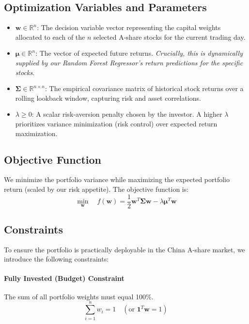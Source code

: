 \documentclass[conference]{IEEEtran}
\begin{document}
\subsection{Optimization Variables and Parameters}
\begin{itemize}
    \item $\mathbf{w} \in \mathbb{R}^n$: The decision variable vector representing the capital weights allocated to each of the $n$ selected A-share stocks for the current trading day.
    \item $\boldsymbol{\mu} \in \mathbb{R}^n$: The vector of expected future returns. \textit{Crucially, this is dynamically supplied by our Random Forest Regressor's return predictions for the specific stocks}.
    \item $\mathbf{\Sigma} \in \mathbb{R}^{n \times n}$: The empirical covariance matrix of historical stock returns over a rolling lookback window, capturing risk and asset correlations.
    \item $\lambda \ge 0$: A scalar risk-aversion penalty chosen by the investor. A higher $\lambda$ prioritizes variance minimization (risk control) over expected return maximization.
\end{itemize}

\subsection{Objective Function}
We minimize the portfolio variance while maximizing the expected portfolio return (scaled by our risk appetite). The objective function is:
\begin{equation}
    \min_{\mathbf{w}} \quad f(\mathbf{w}) = \frac{1}{2} \mathbf{w}^T \mathbf{\Sigma} \mathbf{w} - \lambda \boldsymbol{\mu}^T \mathbf{w}
\end{equation}

\subsection{Constraints}
To ensure the portfolio is practically deployable in the China A-share market, we introduce the following constraints:

\paragraph{Fully Invested (Budget) Constraint} 
The sum of all portfolio weights must equal 100\%. 
\begin{equation}
    \sum_{i=1}^n w_i = 1 \quad (\text{or } \mathbf{1}^T \mathbf{w} = 1)
\end{equation}
\end{document}
